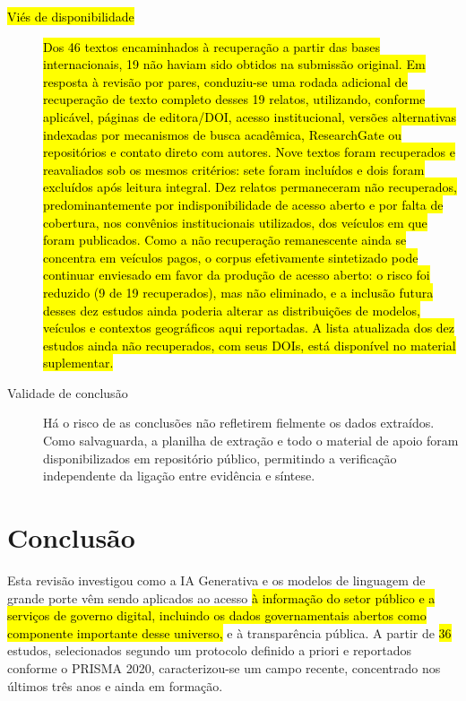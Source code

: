 \documentclass[brazilian]{sbc2025}
\newif\ifhl \hltrue
\newcommand{\rev}[1]{\ifhl\sethlcolor{yellow}\hl{#1}\else#1\fi}
\begin{document}
\begin{description}
\item[\rev{Viés de disponibilidade}] \rev{Dos 46 textos encaminhados à recuperação a partir das bases internacionais, 19 não haviam sido obtidos na submissão original. Em resposta à revisão por pares, conduziu-se uma rodada adicional de recuperação de texto completo desses 19 relatos, utilizando, conforme aplicável, páginas de editora/DOI, acesso institucional, versões alternativas indexadas por mecanismos de busca acadêmica, ResearchGate ou repositórios e contato direto com autores. Nove textos foram recuperados e reavaliados sob os mesmos critérios: sete foram incluídos e dois foram excluídos após leitura integral. Dez relatos permaneceram não recuperados, predominantemente por indisponibilidade de acesso aberto e por falta de cobertura, nos convênios institucionais utilizados, dos veículos em que foram publicados. Como a não recuperação remanescente ainda se concentra em veículos pagos, o corpus efetivamente sintetizado pode continuar enviesado em favor da produção de acesso aberto: o risco foi reduzido (9 de 19 recuperados), mas não eliminado, e a inclusão futura desses dez estudos ainda poderia alterar as distribuições de modelos, veículos e contextos geográficos aqui reportadas. A lista atualizada dos dez estudos ainda não recuperados, com seus DOIs, está disponível no material suplementar.}

\item[Validade de conclusão] Há o risco de as conclusões não refletirem fielmente os dados extraídos. Como salvaguarda, a planilha de extração e todo o material de apoio foram disponibilizados em repositório público, permitindo a verificação independente da ligação entre evidência e síntese.
\end{description}

\section{Conclusão}
\label{sec:conclusao}
Esta revisão investigou como a IA Generativa e os modelos de linguagem de grande porte vêm sendo aplicados ao acesso \rev{à informação do setor público e a serviços de governo digital, incluindo os dados governamentais abertos como componente importante desse universo,} e à transparência pública. A partir de \rev{36} estudos, selecionados segundo um protocolo definido a priori e reportados conforme o PRISMA 2020, caracterizou-se um campo recente, concentrado nos últimos três anos e ainda em formação.
\end{document}
